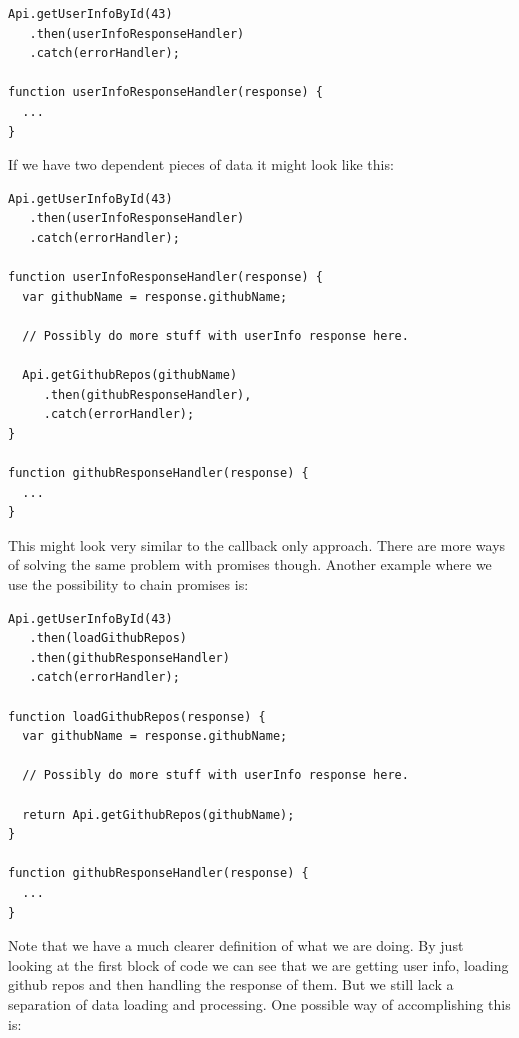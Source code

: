 \documentclass[a4paper,12pt]{article}
\begin{document}
\begin{lstlisting}[caption=Pseudo code showing an approach where we use promises, frame=single]
Api.getUserInfoById(43)
   .then(userInfoResponseHandler)
   .catch(errorHandler);

function userInfoResponseHandler(response) {
  ...
}
\end{lstlisting}

If we have two dependent pieces of data it might look like this:

\begin{lstlisting}[caption=Pseudo code showing an approach using promises where we are loading two pieces of data\, where the second is dependent on the first, frame=single]
Api.getUserInfoById(43)
   .then(userInfoResponseHandler)
   .catch(errorHandler);

function userInfoResponseHandler(response) {
  var githubName = response.githubName;

  // Possibly do more stuff with userInfo response here.

  Api.getGithubRepos(githubName)
     .then(githubResponseHandler), 
     .catch(errorHandler);
}

function githubResponseHandler(response) {
  ...
}
\end{lstlisting}

This might look very similar to the callback only approach. There are more ways of solving the same problem with promises though.
Another example where we use the possibility to chain promises is:

\begin{lstlisting}[caption=Pseudo code showing an approach using promises where we are loading two pieces of data\, where the second is dependent on the first, frame=single]
Api.getUserInfoById(43)
   .then(loadGithubRepos)
   .then(githubResponseHandler)
   .catch(errorHandler);

function loadGithubRepos(response) {
  var githubName = response.githubName;

  // Possibly do more stuff with userInfo response here.

  return Api.getGithubRepos(githubName);
}

function githubResponseHandler(response) {
  ...
}
\end{lstlisting}

Note that we have a much clearer definition of what we are doing. By just looking at the first block of code we can see that we are getting user info, loading github repos and then handling the
response of them. But we still lack a separation of data loading and processing. One possible way of accomplishing this is:
\end{document}
